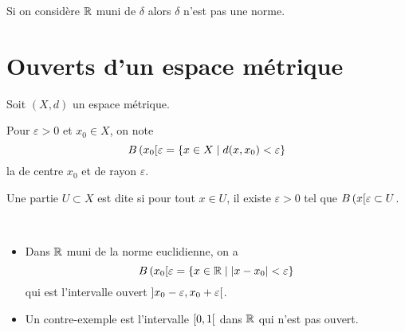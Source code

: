 \begin{remark}
    Si on considère \(\mathbb{R}\) muni de \(\delta\) alors \(\delta\) n'est pas une norme.
\end{remark}

\section{Ouverts d'un espace métrique}\label{sec:ouverts-dun-espace-metrique}

Soit \((X, d)\) un espace métrique.

\begin{definition}
    Pour \(\varepsilon > 0\) et \(x_0\in X\), on note
    \begin{equation*}
        B\left({x_0}\mathopen{}\right[\mathclose{}{\varepsilon} = \{x \in X \mid d(x, x_0) < \varepsilon\}
    \end{equation*}
    la  de centre \(x_0\) et de rayon \(\varepsilon\).
\end{definition}

\begin{definition}
    Une partie \(U \subset X\) est dite  si pour tout \(x \in U\), il existe \(\varepsilon > 0\) tel que \(B\left({x}\mathopen{}\right[\mathclose{}{\varepsilon} \subset U\).
\end{definition}

\begin{example}\,
    \begin{itemize}
        \item Dans \(\mathbb{R}\) muni de la norme euclidienne, on a
        \begin{equation*}
            B\left({x_0}\mathopen{}\right[\mathclose{}{\varepsilon} = \{ x \in \mathbb{R} \mid \left\lvert x - x_0\right\rvert < \varepsilon \}
        \end{equation*}
        qui est l'intervalle ouvert \(\mathopen{}\left]x_0 - \varepsilon, x_0 + \varepsilon\right[\mathclose{}\).

        \item Un contre-exemple est l'intervalle \(\mathopen{}\left[0, 1\right[\mathclose{}\) dans \(\mathbb{R}\) qui n'est pas ouvert.
    \end{itemize}
\end{example}

